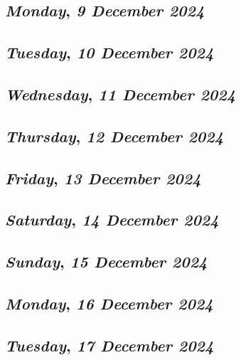 \def\day{\textit{9 December 2024}}
\def\weekday{\textit{Monday}}
\subsection*{\weekday, \day}

\def\day{\textit{10 December 2024}}
\def\weekday{\textit{Tuesday}}
\subsection*{\weekday, \day}

\def\day{\textit{11 December 2024}}
\def\weekday{\textit{Wednesday}}
\subsection*{\weekday, \day}

\def\day{\textit{12 December 2024}}
\def\weekday{\textit{Thursday}}
\subsection*{\weekday, \day}

\def\day{\textit{13 December 2024}}
\def\weekday{\textit{Friday}}
\subsection*{\weekday, \day}

\def\day{\textit{14 December 2024}}
\def\weekday{\textit{Saturday}}
\subsection*{\weekday, \day}

\def\day{\textit{15 December 2024}}
\def\weekday{\textit{Sunday}}
\subsection*{\weekday, \day}

\def\day{\textit{16 December 2024}}
\def\weekday{\textit{Monday}}
\subsection*{\weekday, \day}

\def\day{\textit{17 December 2024}}
\def\weekday{\textit{Tuesday}}
\subsection*{\weekday, \day}

